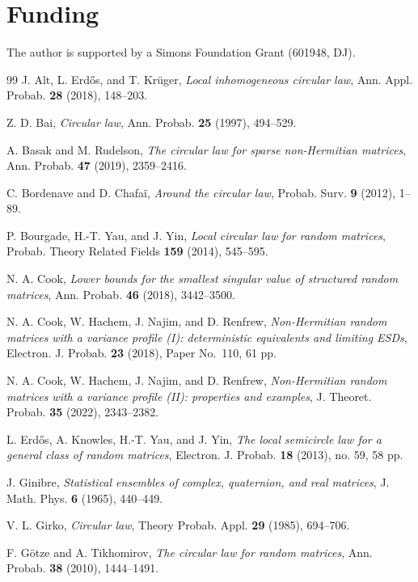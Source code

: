 \documentclass[11pt,reqno]{amsart}
\numberwithin{equation}{section}
\theoremstyle{plain}
\theoremstyle{definition}
\theoremstyle{remark}
\begin{document}
\section*{Funding}
The author is supported by a Simons Foundation Grant (601948, DJ).
\begin{thebibliography}{99}
J. Alt, L. Erd\H{o}s, and T. Kr\"uger,
\emph{Local inhomogeneous circular law},
Ann. Appl. Probab. \textbf{28} (2018), 148--203.

Z. D. Bai, \emph{Circular law},
Ann. Probab. \textbf{25} (1997), 494--529.

A. Basak and M. Rudelson,
\emph{The circular law for sparse non-Hermitian matrices},
Ann. Probab. \textbf{47} (2019), 2359--2416.

C. Bordenave and D. Chafa\"i, \emph{Around the circular law},
Probab. Surv. \textbf{9} (2012), 1--89.

P. Bourgade, H.-T. Yau, and J. Yin,
\emph{Local circular law for random matrices},
Probab. Theory Related Fields \textbf{159} (2014), 545--595.

N. A. Cook,
\emph{Lower bounds for the smallest singular value of structured random matrices},
Ann. Probab. \textbf{46} (2018), 3442--3500.

N. A. Cook, W. Hachem, J. Najim, and D. Renfrew,
\emph{Non-Hermitian random matrices with a variance profile (I):
deterministic equivalents and limiting ESDs},
Electron. J. Probab. \textbf{23} (2018), Paper No.~110, 61 pp.

N. A. Cook, W. Hachem, J. Najim, and D. Renfrew,
\emph{Non-Hermitian random matrices with a variance profile (II):
properties and examples},
J. Theoret. Probab. \textbf{35} (2022), 2343--2382.

L. Erd\H{o}s, A. Knowles, H.-T. Yau, and J. Yin,
\emph{The local semicircle law for a general class of random matrices},
Electron. J. Probab. \textbf{18} (2013), no. 59, 58 pp.

J. Ginibre,
\emph{Statistical ensembles of complex, quaternion, and real matrices},
J. Math. Phys. \textbf{6} (1965), 440--449.

V. L. Girko, \emph{Circular law},
Theory Probab. Appl. \textbf{29} (1985), 694--706.

F. G\"otze and A. Tikhomirov,
\emph{The circular law for random matrices},
Ann. Probab. \textbf{38} (2010), 1444--1491.


\end{thebibliography}
\end{document}
